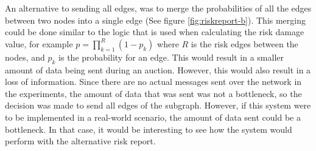 An alternative to sending all edges, was to merge the probabilities of all the edges between two nodes into a single edge (See figure \ref{fig:riskreport-b}). This merging could be done similar to the logic that is used when calculating the risk damage value, for example $p = \prod_{k=1}^{R} (1 - p_{k})$ where $R$ is the risk edges between the nodes, and $p_{k}$ is the probability for an edge. 
This would result in a smaller amount of data being sent during an auction. However, this would also result in a loss of information. Since there are no actual messages sent over the network in the experiments, the amount of data that was sent was not a bottleneck, so the decision was made to send all edges of the subgraph. However, if this system were to be implemented in a real-world scenario, the amount of data sent could be a bottleneck. In that case, it would be interesting to see how the system would perform with the alternative risk report.

